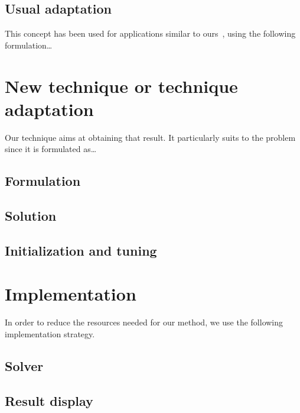 \documentclass[10pt, conference]{IEEEtran}
\begin{document}
\subsection{Usual adaptation}
%
This concept has been used for applications similar to ours~\cite{Sibgrapi2015}, using the following formulation\ldots{}



\section{New technique or technique adaptation}
\label{sec:technique}
%
Our technique aims at obtaining that result. It particularly suits to the problem since it is formulated as\ldots{}


\subsection{Formulation}


\subsection{Solution}


\subsection{Initialization and tuning}



\section{Implementation}
%
In order to reduce the resources needed for our method, we use the following implementation strategy.


\subsection{Solver}


\subsection{Result display}
\end{document}
